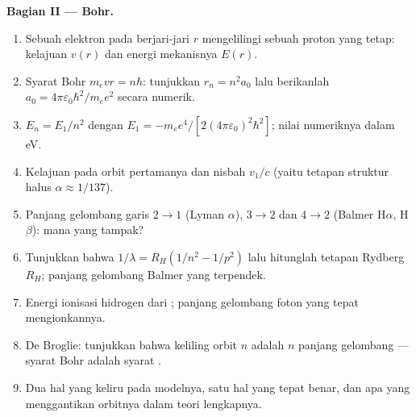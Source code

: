 \begin{problem}
\medskip
\noindent\textbf{Bagian II ---  Bohr.}
\begin{enumerate}[resume]
  \item Sebuah elektron pada  berjari-jari $r$ mengelilingi sebuah proton
        yang tetap: kelajuan $v(r)$ dan energi mekanisnya $E(r)$.
  \item Syarat Bohr $m_evr = n\hbar$: tunjukkan $r_n = n^2a_0$ lalu berikanlah
        $a_0 = 4\pi\varepsilon_0\hbar^2/m_ee^2$ secara numerik.
  \item $E_n = E_1/n^2$ dengan $E_1 = -m_ee^4/[2(4\pi\varepsilon_0)^2\hbar^2]$;
        nilai numeriknya dalam eV.
  \item Kelajuan pada orbit pertamanya dan nisbah $v_1/c$ (yaitu
        tetapan struktur halus $\alpha \approx 1/137$).
  \item Panjang gelombang garis $2 \to 1$ (Lyman $\alpha$), $3 \to 2$ dan
        $4 \to 2$ (Balmer H$\alpha$, H$\beta$): mana yang tampak?
  \item Tunjukkan bahwa $1/\lambda = R_H(1/n^2 - 1/p^2)$ lalu hitunglah tetapan
        Rydberg $R_H$; panjang gelombang Balmer yang terpendek.
  \item Energi ionisasi hidrogen dari ; panjang gelombang
        foton yang tepat mengionkannya.
  \item De Broglie: tunjukkan bahwa keliling orbit $n$ adalah $n$
        panjang gelombang --- syarat Bohr adalah syarat .
  \item Dua hal yang keliru pada modelnya, satu hal yang tepat benar,
        dan apa yang menggantikan orbitnya dalam teori lengkapnya.
\end{enumerate}


\end{problem}
